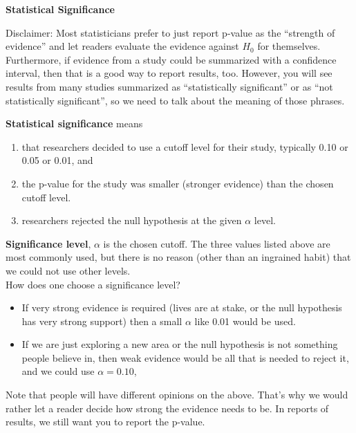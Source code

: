 \def\theTopic{Reading 11}


\begin{center}
  {\large\bf Statistical Significance}
\end{center}

Disclaimer:  Most statisticians prefer to just report p-value as the
``strength of evidence'' and let readers evaluate the evidence against
$H_0$ for themselves.  Furthermore, if evidence from a study could be
summarized with a confidence interval, then that is a good way to
report results, too.  However, you will see results from many studies
summarized as ``statistically significant''  or as ``not statistically
significant'', so we need to talk about the meaning of those phrases.

{\bf Statistical significance} means
\begin{enumerate}
\item that researchers decided to use a  cutoff level for their study,
  typically 0.10 or 0.05 or 0.01, and
\item the p-value for the study was smaller (stronger evidence) than
  the chosen cutoff level.
\item researchers rejected the null hypothesis at the given $\alpha$
  level. 
\end{enumerate}

{\bf Significance level}, $\alpha$ is the chosen cutoff. The three
values listed above are most commonly used, but there is no reason
(other than an ingrained habit) that we could not use other levels.\\
How does one choose a significance level?
\begin{itemize}
  \item If very strong evidence is required (lives are at stake, or
    the null hypothesis has very strong support) then a small $\alpha$
    like 0.01 would be used.
  \item If we are just exploring a new area or the null hypothesis is
    not something people believe in, then weak evidence would be all
    that is needed to reject it, and we could use $\alpha = 0.10$,
\end{itemize}
 Note that people will have different opinions on the above.  That's
 why we would rather let a reader decide how strong the evidence needs
 to be.  In reports of results, we still want you to report the
 p-value. 


